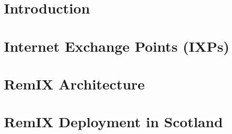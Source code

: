 \documentclass{sig-alternate-10pt}
\begin{document}
\begin{abstract}
\begin{comment}
Rural access networks are designed to bridge the `last-mile' broadband
gap in regions that are under-served by traditional broadband
providers. Their construction is bespoke, driven by their
beneficiaries, and determined by physical landscape, population
distribution, and monetary budget. Irrespective of their differences,
they are joined by one substantial challenge: connecting to the rest
of the Internet is prohibitively expensive. HUBS \textsc{c.i.c} was
created in Scotland to respond to this. It is a co-operative of access
network members that generates the economies of scale required to
afford backhaul and Internet transit. While intermediation at the IP
layer between the members and the Internet is required for reasons of
scale, it is neither necessary nor desirable amongst the member
networks themselves. In urban areas, networks could interconnect with
each other at an Internet Exchange Point (IXP). In Scotland where the
networks are scattered across 80,000km$^2$ of mountain, field, and sea
it is not so easy. We bridge this gap with a design for a distributed
Internet exchange for access networks in remote places. Doing so
allows for bilateral arrangements for mutual support and assistance
between these networks, and increases the resilience of access network
connectivity. We present the relevant components, and describe our
implementation, so that our efforts may be reproduced.
\end{comment} %
\end{abstract}


%
%

\section{Introduction} \label{sec:intro} 

\section{Internet Exchange Points (IXPs)} \label{sec:context} 

\section{RemIX Architecture} \label{sec:arch} 

\section{RemIX Deployment in Scotland} \label{sec:impl} 
\end{document}
